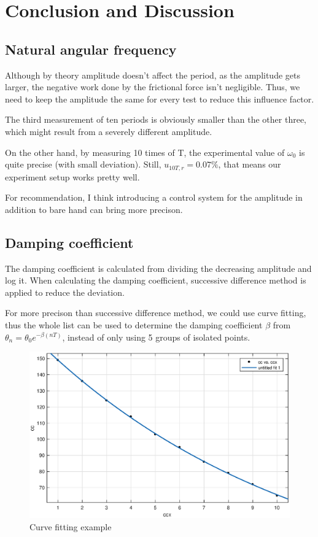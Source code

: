 \section{Conclusion and Discussion}

\subsection{Natural angular frequency}

Although by theory amplitude doesn't affect the period, as the amplitude gets
larger, the negative work done by the frictional force isn't negligible.  
Thus, we need to keep the amplitude the same for every test to reduce this
influence factor.

The third measurement of ten periods is obviously smaller than the other three,
which might result from a severely different amplitude.

On the other hand, by measuring 10 times of T, the experimental value of
$\omega_0$ is quite precise (with small deviation).
Still, $u_{10T,r}=0.07\%$, that means our experiment setup works pretty well.

For recommendation, I think introducing a control system for the amplitude in
addition to bare hand can bring more precison.



\subsection{Damping coefficient}

The damping coefficient is calculated from dividing the decreasing
amplitude and log it.
When calculating the damping coefficient, successive difference method is applied
to reduce the deviation. 

For more precison than successive difference method, we could use curve fitting,
thus the whole list can be used to determine the damping coefficient $\beta$
from $\theta_n=\theta_0e^{-\beta (nT)}$, instead of only using 5 groups of
isolated points. 

\begin{figure}[H]
\centering
\includegraphics[width=1\textwidth]{matlab/p3}
\caption{Curve fitting example}
\end{figure}

